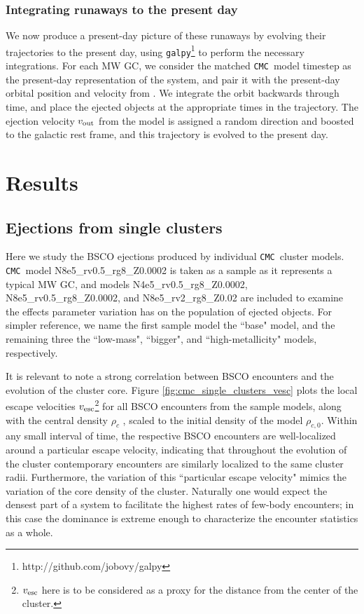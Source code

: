 \documentclass[twocolumn]{aastex631}
\newcommand{\CMC}{\texttt{CMC}}
\begin{document}
\subsubsection{Integrating runaways to the present day} \label{subsubsec:galpy}

We now produce a present-day picture of these runaways by evolving their trajectories to the present day, using \texttt{galpy}\footnote{http://github.com/jobovy/galpy} \citep{2015ApJS..216...29B} to perform the necessary integrations.
For each MW GC, we consider the matched \CMC\ model timestep as the present-day representation of the system, and pair it with the present-day orbital position and velocity from \citet{2018MNRAS.478.1520B}.
We integrate the orbit backwards through time, and place the ejected objects at the appropriate times in the trajectory.
The ejection velocity $v_{\rm out}$ from the model is assigned a random direction and boosted to the galactic rest frame, and this trajectory is evolved to the present day.

\section{Results} \label{sec:results}

\subsection{Ejections from single clusters} \label{subsec:single_clusters}

Here we study the BSCO ejections produced by individual \CMC\ cluster models.
\CMC\ model N8e5\_rv0.5\_rg8\_Z0.0002 is taken as a sample as it represents a typical MW GC, and models N4e5\_rv0.5\_rg8\_Z0.0002, N8e5\_rv0.5\_rg8\_Z0.0002, and N8e5\_rv2\_rg8\_Z0.02 are included to examine the effects parameter variation has on the population of ejected objects.
For simpler reference, we name the first sample model the ``base" model, and the remaining three the ``low-mass", ``bigger", and ``high-metallicity" models, respectively.

It is relevant to note a strong correlation between BSCO encounters and the evolution of the cluster core.
Figure \ref{fig:cmc_single_clusters_vesc} plots the local escape velocities $v_{\rm esc}$\footnote{$v_{\rm esc}$ here is to be considered as a proxy for the distance from the center of the cluster.} for all BSCO encounters from the sample models, along with the central density $\rho_c$ \citep{1985ApJ...298...80C}, scaled to the initial density of the model $\rho_{c,0}$.
Within any small interval of time, the respective BSCO encounters are well-localized around a particular escape velocity, indicating that throughout the evolution of the cluster contemporary encounters are similarly localized to the same cluster radii.
Furthermore, the variation of this ``particular escape velocity" mimics the variation of the core density of the cluster.
Naturally one would expect the densest part of a system to facilitate the highest rates of few-body encounters; in this case the dominance is extreme enough to characterize the encounter statistics as a whole.
\end{document}
